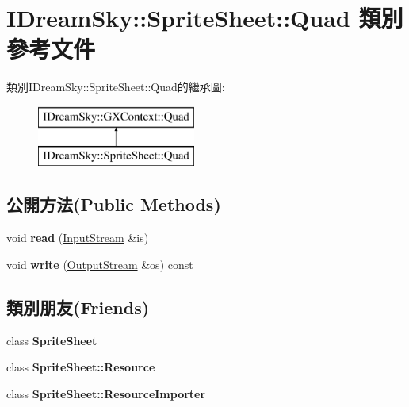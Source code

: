 \hypertarget{class_i_dream_sky_1_1_sprite_sheet_1_1_quad}{}\section{I\+Dream\+Sky\+:\+:Sprite\+Sheet\+:\+:Quad 類別 參考文件}
\label{class_i_dream_sky_1_1_sprite_sheet_1_1_quad}
類別\+I\+Dream\+Sky\+:\+:Sprite\+Sheet\+:\+:Quad的繼承圖\+:\begin{figure}[H]
\begin{center}
\leavevmode
\includegraphics[height=2.000000cm]{class_i_dream_sky_1_1_sprite_sheet_1_1_quad}
\end{center}
\end{figure}
\subsection*{公開方法(Public Methods)}
\begin{DoxyCompactItemize}
\item 
void {\bfseries read} (\hyperlink{class_i_dream_sky_1_1_input_stream}{Input\+Stream} \&is)\hypertarget{class_i_dream_sky_1_1_sprite_sheet_1_1_quad_a5c348e9fbe412c4d9c16b40816c06eec}{}\label{class_i_dream_sky_1_1_sprite_sheet_1_1_quad_a5c348e9fbe412c4d9c16b40816c06eec}

\item 
void {\bfseries write} (\hyperlink{class_i_dream_sky_1_1_output_stream}{Output\+Stream} \&os) const \hypertarget{class_i_dream_sky_1_1_sprite_sheet_1_1_quad_a5318c4eff65c038dde605dbd5e9a966f}{}\label{class_i_dream_sky_1_1_sprite_sheet_1_1_quad_a5318c4eff65c038dde605dbd5e9a966f}

\end{DoxyCompactItemize}
\subsection*{類別朋友(Friends)}
\begin{DoxyCompactItemize}
\item 
class {\bfseries Sprite\+Sheet}\hypertarget{class_i_dream_sky_1_1_sprite_sheet_1_1_quad_ab43118917ba092ba6289c7ee4cd3e5fd}{}\label{class_i_dream_sky_1_1_sprite_sheet_1_1_quad_ab43118917ba092ba6289c7ee4cd3e5fd}

\item 
class {\bfseries Sprite\+Sheet\+::\+Resource}\hypertarget{class_i_dream_sky_1_1_sprite_sheet_1_1_quad_a8727041c910f9527ea7b20dfac74f485}{}\label{class_i_dream_sky_1_1_sprite_sheet_1_1_quad_a8727041c910f9527ea7b20dfac74f485}

\item 
class {\bfseries Sprite\+Sheet\+::\+Resource\+Importer}\hypertarget{class_i_dream_sky_1_1_sprite_sheet_1_1_quad_a3c6baee866d2819736b4c0a94c9e507c}{}\label{class_i_dream_sky_1_1_sprite_sheet_1_1_quad_a3c6baee866d2819736b4c0a94c9e507c}

\end{DoxyCompactItemize}
